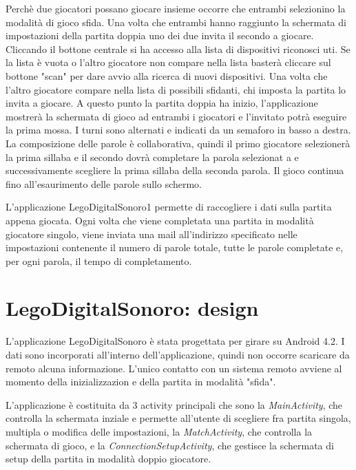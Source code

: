 Perchè due giocatori possano giocare insieme occorre che entrambi selezionino la modalità di gioco sfida. Una volta che entrambi hanno raggiunto la schermata di impostazioni della partita doppia uno dei due invita il secondo a giocare. Cliccando il bottone centrale si ha accesso alla lista di dispositivi riconosci uti. Se la lista è vuota o l'altro giocatore non compare nella lista basterà cliccare sul bottone "scan" per dare avvio alla ricerca di nuovi dispositivi. Una volta che l'altro giocatore compare nella lista di possibili sfidanti, chi imposta la partita lo invita a giocare. A questo punto la partita doppia ha inizio, l'applicazione mostrerà la schermata di gioco ad entrambi i giocatori e l'invitato potrà eseguire la prima mossa. I turni sono alternati e indicati da un semaforo in basso a destra. La composizione delle parole è collaborativa, quindi il primo giocatore selezionerà la prima sillaba e il secondo dovrà completare la parola selezionat a e successivamente scegliere la prima sillaba della seconda parola. Il gioco continua fino all'esaurimento delle parole sullo schermo.



L'applicazione LegoDigitalSonoro1 permette di raccogliere i dati sulla partita appena giocata. Ogni volta che viene completata una partita in modalità giocatore singolo, viene inviata una mail all'indirizzo specificato nelle impostazioni contenente il numero di parole totale, tutte le parole completate e, per ogni parola, il tempo di completamento.

\section{LegoDigitalSonoro: design}

L'applicazione LegoDigitalSonoro è stata progettata per girare su Android 4.2. I dati sono incorporati all'interno dell'applicazione, quindi non occorre scaricare da remoto alcuna informazione. L'unico contatto con un sistema remoto avviene al momento della inizializzazion e della partita in modalità "sfida".

L'applicazione è costituita da 3 activity principali che sono la \emph{MainActivity}, che controlla la schermata inziale e permette all'utente di scegliere fra partita singola, multipla o modifica delle impostazioni, la \emph{MatchActivity}, che controlla la schermata di gioco, e la \emph{ConnectionSetupActivity}, che gestisce la schermata di setup della partita in modalità doppio giocatore.

